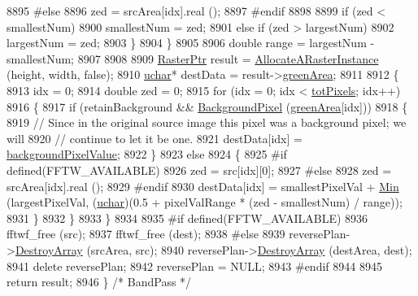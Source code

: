 \begin{DoxyCode}
8895 \textcolor{preprocessor}{      #else}
8896         zed = srcArea[idx].real ();
8897 \textcolor{preprocessor}{      #endif}
8898 
8899       \textcolor{keywordflow}{if}  (zed < smallestNum)
8900         smallestNum = zed;
8901       \textcolor{keywordflow}{else} \textcolor{keywordflow}{if}  (zed > largestNum)
8902         largestNum = zed;
8903     \}
8904   \}
8905 
8906   \textcolor{keywordtype}{double}  range = largestNum - smallestNum;
8907 
8908 
8909   \hyperlink{class_k_k_b_1_1_raster}{RasterPtr}  result = \hyperlink{class_k_k_b_1_1_raster_aa879980d112c01cb7ad9a3cfc7cd6f64}{AllocateARasterInstance} (height, width, \textcolor{keyword}{false});
8910   \hyperlink{namespace_k_k_b_ace9969169bf514f9ee6185186949cdf7}{uchar}*  destData = result->\hyperlink{class_k_k_b_1_1_raster_ad981258f1f7284a8bd0cd0466f328cdf}{greenArea};
8911   
8912   \{
8913     idx = 0;
8914     \textcolor{keywordtype}{double}  zed = 0;
8915     \textcolor{keywordflow}{for} (idx = 0;  idx < \hyperlink{class_k_k_b_1_1_raster_a9b08c4a0ca0a35435a478599635f1dc0}{totPixels};  idx++)
8916     \{     
8917       \textcolor{keywordflow}{if}  (retainBackground  &&  \hyperlink{class_k_k_b_1_1_raster_a0756fb5530274d5e28858d3e1633d595}{BackgroundPixel} (\hyperlink{class_k_k_b_1_1_raster_ad981258f1f7284a8bd0cd0466f328cdf}{greenArea}[idx]))
8918       \{
8919         \textcolor{comment}{// Since in the original source image this pixel was a background pixel;  we will}
8920         \textcolor{comment}{// continue to let it be one.}
8921         destData[idx] = \hyperlink{class_k_k_b_1_1_raster_ab7ed2191cce116a6a37029dc6e3713ef}{backgroundPixelValue};
8922       \}
8923       \textcolor{keywordflow}{else}
8924       \{
8925 \textcolor{preprocessor}{        #if  defined(FFTW\_AVAILABLE)}
8926           zed = src[idx][0];
8927 \textcolor{preprocessor}{        #else}
8928           zed = srcArea[idx].real ();
8929 \textcolor{preprocessor}{        #endif}
8930         destData[idx] = smallestPixelVal + \hyperlink{namespace_k_k_b_ad030d1ca8bd5038824c4a923a4d23fb5}{Min} (largestPixelVal, (\hyperlink{namespace_k_k_b_ace9969169bf514f9ee6185186949cdf7}{uchar})(0.5 + pixelValRange * (zed
       - smallestNum) / range));
8931       \}
8932     \}
8933   \}
8934 
8935 \textcolor{preprocessor}{  #if  defined(FFTW\_AVAILABLE)}
8936     fftwf\_free (src);
8937     fftwf\_free (dest);
8938 \textcolor{preprocessor}{  #else}
8939     reversePlan->\hyperlink{class_k_k_b_1_1_k_k___d_f_t2_d_af5cf4a6e9954117f5cb14470bae40ebd}{DestroyArray} (srcArea,  src);
8940     reversePlan->\hyperlink{class_k_k_b_1_1_k_k___d_f_t2_d_af5cf4a6e9954117f5cb14470bae40ebd}{DestroyArray} (destArea, dest);
8941     \textcolor{keyword}{delete}  reversePlan;
8942     reversePlan = NULL;
8943 \textcolor{preprocessor}{  #endif}
8944 
8945   \textcolor{keywordflow}{return}  result;
8946 \}  \textcolor{comment}{/* BandPass */}
\end{DoxyCode}
